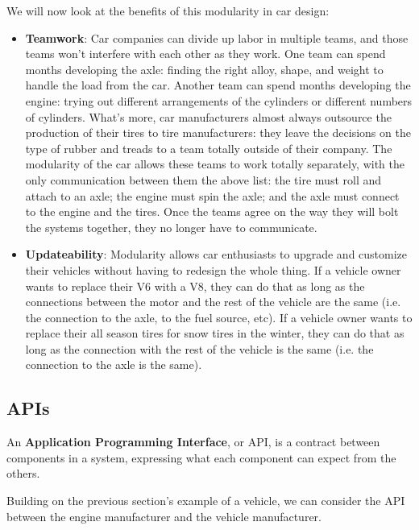 We will now look at the benefits of this modularity in car design:

\begin{itemize}
	\item \textbf{Teamwork}: Car companies can divide up labor in multiple teams, and those teams won't interfere with each other as they work. One team can spend months developing the axle: finding the right alloy, shape, and weight to handle the load from the car. Another team can spend months developing the engine: trying out different arrangements of the cylinders or different numbers of cylinders. What's more, car manufacturers almost always outsource the production of their tires to tire manufacturers: they leave the decisions on the type of rubber and treads to a team totally outside of their company. The modularity of the car allows these teams to work totally separately, with the only communication between them the above list: the tire must roll and attach to an axle; the engine must spin the axle; and the axle must connect to the engine and the tires. Once the teams agree on the way they will bolt the systems together, they no longer have to communicate. 
    
	\item \textbf{Updateability}: Modularity allows car enthusiasts to upgrade and customize their vehicles without having to redesign the whole thing. If a vehicle owner wants to replace their V6 with a V8, they can do that as long as the connections between the motor and the rest of the vehicle are the same (i.e. the connection to the axle, to the fuel source, etc). If a vehicle owner wants to replace their all season tires for snow tires in the winter, they can do that as long as the connection with the rest of the vehicle is the same (i.e. the connection to the axle is the same). 
\end{itemize}

\subsection{APIs}
\begin{definition}
An \textbf{Application Programming Interface}, or API, is a contract between components in a system, expressing what each component can expect from the others. 
\end{definition}

Building on the previous section's example of a vehicle, we can consider the API between the engine manufacturer and the vehicle manufacturer. 

